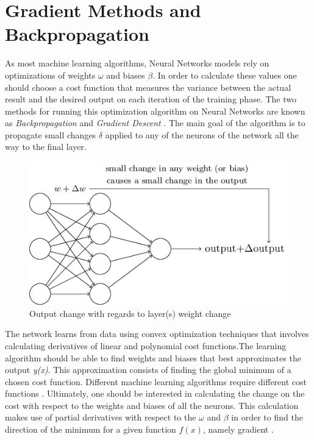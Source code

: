 \section{Gradient Methods and Backpropagation}

As most machine learning algorithms, Neural Networks models rely on optimizations of weights $\omega$ and biases $\beta$. In order to calculate these values one should  choose a cost function that measures the variance between the actual result and the desired output on each iteration of the training phase. The two methods for running this optimization algorithm on Neural Networks are known as \textit{Backpropagation} and \textit{Gradient Descent} \cite{goodfellow2016_book}. The main goal of the algorithm is to propagate small changes $\delta$ applied to any of the neurons of the network all the way to the final layer.

\begin{figure}[h!]
\centering
	\includegraphics[scale=0.5]{net_change.png}
\caption{Output change with regards to layer(s) weight change \cite{nielsen2016}}
\label{fig:net_change}
\end{figure}


The network learns from data using convex optimization techniques that involves calculating derivatives of linear and polynomial cost functions.The learning algorithm should be able to find weights and biases that best approximates the output \textit{y(x)}. This approximation consists of finding the global minimum of a chosen cost function. Different machine learning algorithms require different cost functions \cite{nielsen2016}. Ultimately, one should be interested in calculating the change on the cost with respect to the weights and biases of all the neurons. This calculation makes use of partial derivatives with respect to the $\omega$ and $\beta$ in order to find the direction of the minimum for a given function $f(x)$, namely gradient \cite{goodfellow2016_book}.

